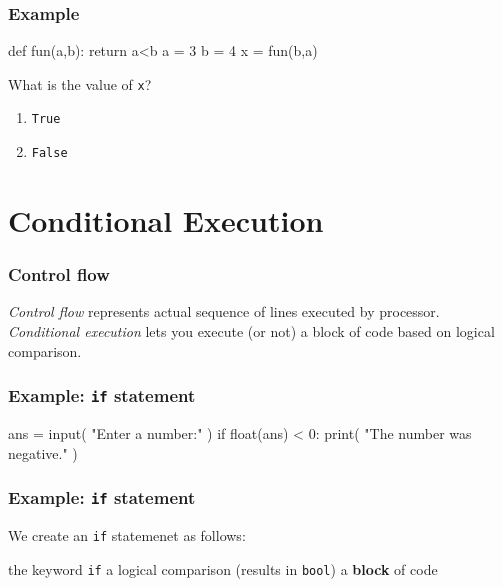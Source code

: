 \documentclass[11pt]{beamer}
\begin{document}
\begin{frame}[fragile]
  \frametitle{Example}
  \Enlarge

  \begin{semiverbatim}
def fun(a,b):
    return a<b
a = 3
b = 4
x = fun(b,a)
  \end{semiverbatim}
  What is the value of \texttt{x}?
  \begin{enumerate}[label=\Alph*]
  \item  \texttt{True}
  \item  \texttt{False}
  \end{enumerate}
\end{frame}

\section{Conditional Execution}

\begin{frame}[fragile]
  \frametitle{Control flow}
  \Enlarge

  \begin{itemize}
  \myitem  \emph{Control flow} represents actual sequence of lines executed by processor.
  \myitem  \emph{Conditional execution} lets you execute (or not) a block of code based on logical comparison.
  \end{itemize}
\end{frame}

\begin{frame}[fragile]
  \frametitle{Example:  \texttt{if} statement}
  \Enlarge

  \begin{semiverbatim}
ans = input( "Enter a number:" )
if float(ans) < 0:
    print( "The number was negative." )
  \end{semiverbatim}
\end{frame}

\begin{frame}[fragile]
  \frametitle{Example:  \texttt{if} statement}
  \Enlarge

  \begin{itemize}
  \myitem  We create an \texttt{if} statemenet as follows:
    \begin{itemize}
    \mysubitem  the keyword \texttt{if}
    \mysubitem  a logical comparison (results in \texttt{bool})
    \mysubitem  a \textbf{block} of code
    \end{itemize}
  \end{itemize}
\end{frame}
\end{document}
